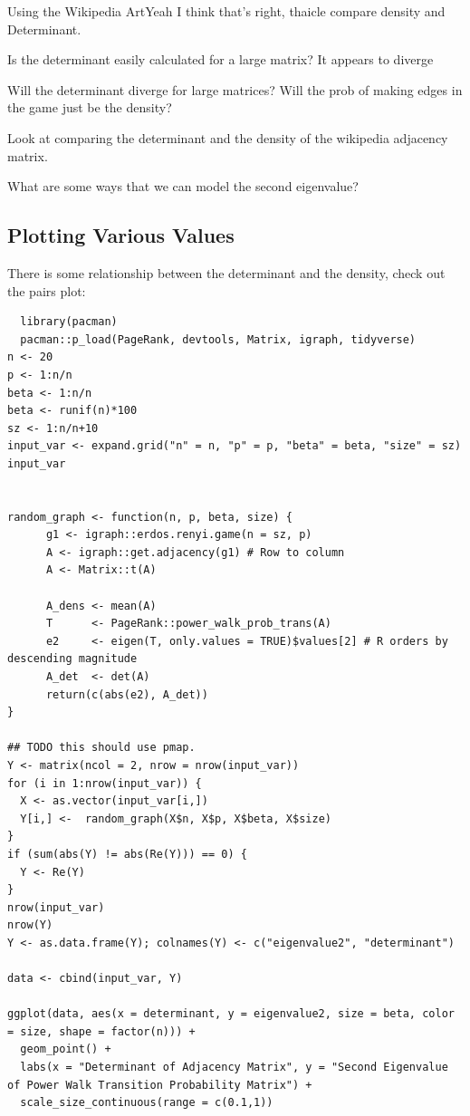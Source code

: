 \documentclass[11pt]{article}
\begin{document}
Using the Wikipedia ArtYeah I think that's right, thaicle compare density and Determinant.

Is the determinant easily calculated for a large matrix?
  It appears to diverge

Will the determinant diverge for large matrices?
Will the prob of making edges in the game just be the density?

Look at comparing the determinant and the density of the wikipedia adjacency matrix.

What are some ways that we can model the second eigenvalue?

\subsection{Plotting Various Values}
\label{sec:org4956814}

There is some relationship between the determinant and the density, check out the pairs plot:



\begin{verbatim}
  library(pacman)
  pacman::p_load(PageRank, devtools, Matrix, igraph, tidyverse)
n <- 20
p <- 1:n/n
beta <- 1:n/n
beta <- runif(n)*100
sz <- 1:n/n+10
input_var <- expand.grid("n" = n, "p" = p, "beta" = beta, "size" = sz)
input_var


random_graph <- function(n, p, beta, size) {
      g1 <- igraph::erdos.renyi.game(n = sz, p)
      A <- igraph::get.adjacency(g1) # Row to column
      A <- Matrix::t(A)

      A_dens <- mean(A)
      T      <- PageRank::power_walk_prob_trans(A)
      e2     <- eigen(T, only.values = TRUE)$values[2] # R orders by descending magnitude
      A_det  <- det(A)
      return(c(abs(e2), A_det))
}

## TODO this should use pmap.
Y <- matrix(ncol = 2, nrow = nrow(input_var))
for (i in 1:nrow(input_var)) {
  X <- as.vector(input_var[i,])
  Y[i,] <-  random_graph(X$n, X$p, X$beta, X$size)
}
if (sum(abs(Y) != abs(Re(Y))) == 0) {
  Y <- Re(Y)
}
nrow(input_var)
nrow(Y)
Y <- as.data.frame(Y); colnames(Y) <- c("eigenvalue2", "determinant")

data <- cbind(input_var, Y)

ggplot(data, aes(x = determinant, y = eigenvalue2, size = beta, color = size, shape = factor(n))) +
  geom_point() +
  labs(x = "Determinant of Adjacency Matrix", y = "Second Eigenvalue of Power Walk Transition Probability Matrix") +
  scale_size_continuous(range = c(0.1,1))
\end{verbatim}
\end{document}
